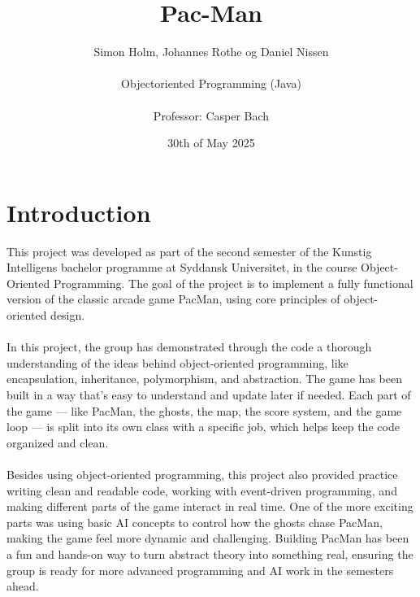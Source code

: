 \documentclass[a4paper,5pt]{article}
\title{Pac-Man}
\author{Simon Holm, Johannes Rothe og Daniel Nissen\\\\Objectoriented Programming (Java)\\\\ Professor: Casper Bach}
\date{30th of May 2025}
\begin{document}
\maketitle
\newpage
\tableofcontents
\newpage
\section{Introduction}
This project was developed as part of the second semester of the Kunstig Intelligens bachelor programme at Syddansk Universitet, in the course Object-Oriented Programming. The goal of the project is to implement a fully functional version of the classic arcade game PacMan, using core principles of object-oriented design.\\\\In this project, the group has demonstrated through the code a thorough understanding of the ideas behind object-oriented programming, like encapsulation, inheritance, polymorphism, and abstraction. The game has been built in a way that's easy to understand and update later if needed. Each part of the game — like PacMan, the ghosts, the map, the score system, and the game loop — is split into its own class with a specific job, which helps keep the code organized and clean.\\\\Besides using object-oriented programming, this project also provided practice writing clean and readable code, working with event-driven programming, and making different parts of the game interact in real time. One of the more exciting parts was using basic AI concepts to control how the ghosts chase PacMan, making the game feel more dynamic and challenging. Building PacMan has been a fun and hands-on way to turn abstract theory into something real, ensuring the group is ready for more advanced programming and AI work in the semesters ahead.
\newpage
\end{document}
